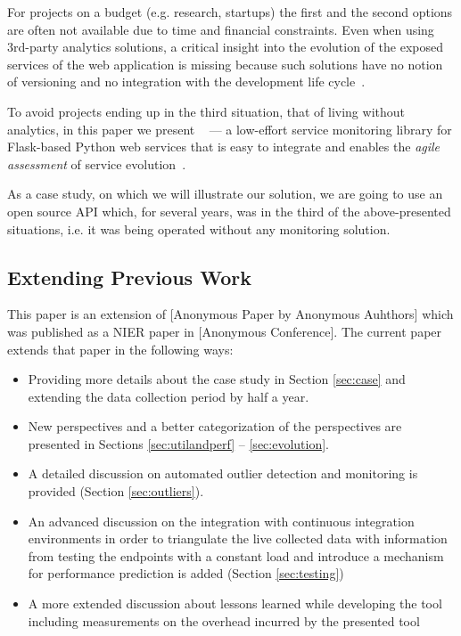 
For projects on a budget (e.g. research, startups) the first and the second options are often not available due to time and financial constraints. Even when using 3rd-party analytics solutions, a critical insight into the evolution of the exposed services of the web application is missing because such solutions have no notion of versioning and no integration with the development life cycle~\cite{papazoglou2011managing}.

To avoid projects ending up in the third situation, that of living without analytics, in this paper we present \tool~ --- a low-effort service monitoring library for Flask-based Python web services that is easy to integrate and enables the {\em agile assessment} of service evolution~\cite{Nier12b}. 

As a case study, on which we will illustrate our solution, we are going to use an open source API which, for several years, was in the third of the above-presented situations, i.e. it was being operated without any monitoring solution.


\subsection*{Extending Previous Work}

This paper is an extension of [Anonymous Paper by Anonymous Auhthors] which was published as a NIER paper in [Anonymous Conference]. The current paper extends that paper in the following ways: 
\begin{itemize}
  \item Providing more details about the case study in Section \ref{sec:case} and extending the data collection period by half a year.
  \item New perspectives and a better categorization of the perspectives are presented in Sections \ref{sec:utilandperf} -- \ref{sec:evolution}.
  \item A detailed discussion on automated outlier detection and monitoring is provided (Section \ref{sec:outliers}).
  \item An advanced discussion on the integration with continuous integration environments in order to triangulate the live collected data with information from testing the endpoints with a constant load and introduce a mechanism for performance prediction is added (Section \ref{sec:testing})
  \item A more extended discussion about lessons learned while developing the tool including measurements on the overhead incurred by the presented tool 
\end{itemize}



